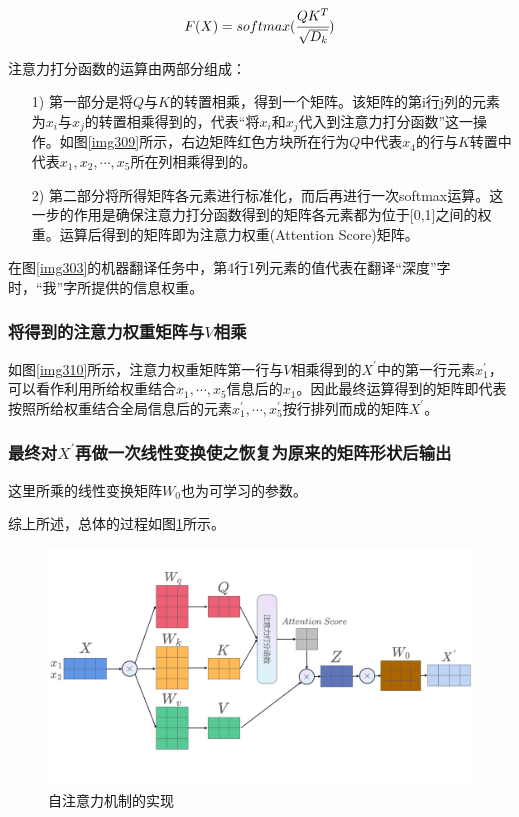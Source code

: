 \begin{equation} \label{302}
	\begin{aligned}
		F(X)=softmax(\cfrac{QK^T}{\sqrt{D_k}})
	\end{aligned}
\end{equation}

注意力打分函数的运算由两部分组成：

\begin{itemize}
	\item [1)]
	第一部分是将$Q$与$K$的转置相乘，得到一个矩阵。该矩阵的第i行j列的元素为$x_i$与$x_j$的转置相乘得到的，代表“将$x_i$和$x_j$代入到注意力打分函数”这一操作。如图\ref{img309}所示，右边矩阵红色方块所在行为$Q$中代表$x_4$的行与$K$转置中代表$x_1,x_2,\cdots ,x_5$所在列相乘得到的。
	\item [2)]
	第二部分将所得矩阵各元素进行标准化，而后再进行一次softmax运算。这一步的作用是确保注意力打分函数得到的矩阵各元素都为位于[0,1]之间的权重。运算后得到的矩阵即为注意力权重(Attention Score)矩阵。
\end{itemize}

在图\ref{img303}的机器翻译任务中，第4行1列元素的值代表在翻译“深度”字时，“我”字所提供的信息权重。

\subsubsection{将得到的注意力权重矩阵与$V$相乘}
如图\ref{img310}所示，注意力权重矩阵第一行与$V$相乘得到的$X^{'}$中的第一行元素$x_1^{'}$，可以看作利用所给权重结合$x_1,\cdots ,x_5$信息后的$x_1$。因此最终运算得到的矩阵即代表按照所给权重结合全局信息后的元素$x_1^{'}, \cdots ,x_5^{'}$按行排列而成的矩阵$X^{'}$。

\subsubsection{最终对$X^{'}$再做一次线性变换使之恢复为原来的矩阵形状后输出}
这里所乘的线性变换矩阵$W_0$也为可学习的参数。

综上所述，总体的过程如图\ref{img311}所示。

\begin{figure}[h]
	\centering
	\includegraphics[width=0.75\columnwidth]{image/chap03/img311.png}
	\caption{自注意力机制的实现}
	\label{img311}
\end{figure}

